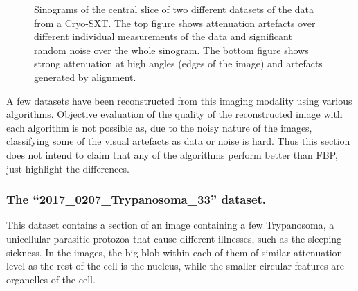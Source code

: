 \begin{figure}
\centering
{}

\caption[Sinograms of the data from a Cryo-SXT]{\label{fig:Cryo-SXT} Sinograms of the central slice of two different datasets of the data from a Cryo-SXT. The top figure shows attenuation artefacts over different individual measurements of the data and significant random noise over the whole sinogram. The bottom figure shows strong attenuation at high angles (edges of the image) and artefacts generated by alignment. } 
\end{figure}




A few datasets have been reconstructed from this imaging modality using various algorithms. Objective evaluation of the quality of the reconstructed image with each algorithm is not possible as, due to the noisy nature of the images, classifying some of the visual artefacts as data or noise is hard. Thus this section does not intend to claim that any of the algorithms perform better than FBP, just highlight the differences.

\subsubsection{The ``2017\_0207\_Trypanosoma\_33'' dataset.} This dataset contains a section of an image containing a few Trypanosoma, a unicellular parasitic protozoa that cause different illnesses, such as the sleeping sickness. In the images, the big blob within each of them of similar attenuation level as the rest of the cell is the nucleus, while the smaller circular features are organelles of the cell.

